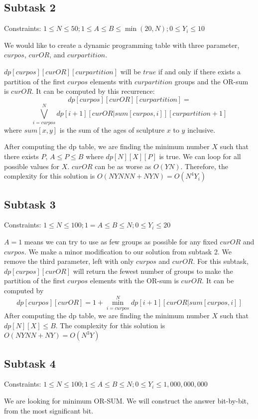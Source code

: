 \documentclass[a4paper]{article}
\begin{document}
\subsection*{Subtask 2}
Constraints: $1\leq N \leq 50; 1 \leq A \leq B \leq \min(20,N); 0 \leq Y_i \leq 10$

We would like to create a dynamic programming table with three parameter, $curpos$, $curOR$, and $curpartition$.

$dp[curpos][curOR][curpartition]$ will be $true$ if and only if there exists a partition of the first $curpos$ elements with $curpartition$ groups and the OR-sum is $curOR$. It can be computed by this recurrence:
\[dp[curpos][curOR][curpartition] =\]
\[\bigvee\limits_{i=curpos}^{N}dp[i+1][curOR | sum[curpos,i]][curpartition+1]\]
where $sum[x,y]$ is the sum of the ages of sculpture $x$ to $y$ inclusive.

After computing the dp table, we are finding the minimum number $X$ such that there exists $P$, $A \leq P \leq B$ where $dp[N][X][P]$ is true. We can loop for all possible values for $X$. $curOR$ can be as worse as $O(YN)$. Therefore, the complexity for this solution is $O(NYNNN + NYN) = O(N^4Y_i)$

\subsection*{Subtask 3}
Constraints: $1\leq N \leq 100; 1 = A \leq B \leq N; 0 \leq Y_i \leq 20$

$A = 1$ means we can try to use as few groups as possible for any fixed $curOR$ and $curpos$. We make a minor modification to our solution from subtask 2. We remove the third parameter, left with only $curpos$ and $curOR$. For this subtask, $dp[curpos][curOR]$ will return the fewest number of groups to make the partition of the first $curpos$ elements with the OR-sum is $curOR$. It can be computed by
\[dp[curpos][curOR] = 1 + \min_{i=curpos}^{N}dp[i+1][curOR | sum[curpos,i]] \]
After computing the dp table, we are finding the minimum number $X$ such that $dp[N][X] \leq B$. The complexity for this solution is $O(NYNN + NY) = O(N^3Y)$

\subsection*{Subtask 4}
Constraints: $1\leq N \leq 100; 1 \leq A \leq B \leq N; 0 \leq Y_i \leq 1,000,000,000$

We are looking for minimum OR-SUM. We will construct the answer bit-by-bit, from the most significant bit.
\end{document}
